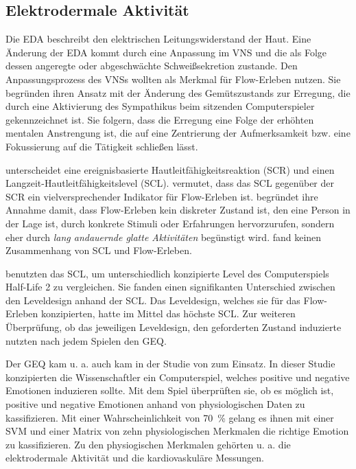 \subsection{Elektrodermale Aktivität} %
\label{sub:elektrodermale_aktivitat}

Die \ac{EDA} beschreibt den elektrischen Leitungswiderstand der Haut. Eine Änderung der \ac{EDA} kommt durch eine Anpassung im \ac{VNS} und die als Folge dessen angeregte oder abgeschwächte Schweißsekretion zustande. Den Anpassungsprozess des \ac{VNS}s wollten \citet{Kivikangas2006, Nacke2008} als Merkmal für Flow-Erleben nutzen. Sie begründen ihren Ansatz mit der Änderung des Gemütszustands zur Erregung, die durch eine Aktivierung des Sympathikus beim sitzenden Computerspieler gekennzeichnet ist. Sie folgern, dass die Erregung eine Folge der erhöhten mentalen Anstrengung ist, die auf eine Zentrierung der Aufmerksamkeit bzw. eine Fokussierung auf die Tätigkeit schließen lässt.

\citet{Kilpatrick1972} unterscheidet eine ereignisbasierte Hautleitfähigkeitsreaktion (\ac{SCR}) und einen Langzeit-Hautleitfähigkeitslevel (\ac{SCL}). \citet[][S.~158]{Peifer2012} vermutet, dass das \ac{SCL} gegenüber der \ac{SCR} ein vielversprechender Indikator für Flow-Erleben ist. \citet[][S.~158]{Peifer2012} begründet ihre Annahme damit, dass Flow-Erleben kein diskreter Zustand ist, den eine Person in der Lage ist, durch konkrete Stimuli oder Erfahrungen hervorzurufen, sondern eher durch \emph{lang andauernde glatte Aktivitäten} begünstigt wird. \citet{Kilpatrick1972} fand keinen Zusammenhang von \ac{SCL} und Flow-Erleben. 

\citet{Nacke2008} benutzten das \ac{SCL}, um unterschiedlich konzipierte Level des Computerspiels Half-Life 2 zu vergleichen. Sie fanden einen signifikanten Unterschied zwischen den Leveldesign anhand der \ac{SCL}. Das Leveldesign, welches sie für das Flow-Erleben konzipierten, hatte im Mittel das höchste \ac{SCL}. Zur weiteren Überprüfung, ob das jeweiligen Leveldesign, den geforderten Zustand induzierte nutzten \citet{Nacke2008} nach jedem Spielen den \ac{GEQ}.

Der \ac{GEQ} kam u. a. auch kam in der Studie von \citet{Friedrichs2015} zum Einsatz. In dieser Studie konzipierten die Wissenschaftler ein Computerspiel, welches positive und negative Emotionen induzieren sollte. Mit dem Spiel überprüften sie, ob es möglich ist, positive und negative Emotionen anhand von physiologischen Daten zu kassifizieren. Mit einer Wahrscheinlichkeit von 70~\% gelang es ihnen mit einer \ac{SVM} und einer Matrix von zehn physiologischen Merkmalen die richtige Emotion zu kassifizieren. Zu den physiogischen Merkmalen gehörten u. a. die elektrodermale Aktivität und die kardiovaskuläre Messungen.

